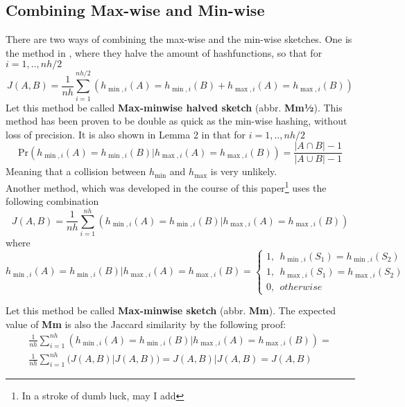 \documentclass[../../main.tex]{subfiles}
\begin{document}
\subsection{Combining Max-wise and Min-wise}

There are two ways of combining the max-wise and the min-wise sketches. One is the method in \cite{minmaxhash}, where they halve the amount of hashfunctions, so that for $i=1,..,nh/2$
\begin{equation}\label{minmaxhalfjaccard}
J(A,B)=\frac{1}{nh}\sum_{i=1}^{nh/2}(h_{\min,i}(A) = h_{\min,i}(B) + h_{\max,i}(A) = h_{\max,i}(B))
\end{equation}
Let this method be called \textbf{Max-minwise halved sketch} (abbr. {\bf Mm½}). This method has been proven to be double as quick as the min-wise hashing, without loss of precision\cite{minmaxhash}. It is also shown in Lemma 2 in \cite{minmaxhash} that for $i=1,..,nh/2$
$$
\mathrm{Pr}(h_{\min,i}(A) = h_{\min,i}(B) | h_{\max,i}(A) = h_{\max,i}(B)) = \frac{|A\cap B|-1}{|A\cup B| -1}
$$
Meaning that a collision between $h_{\min}$ and $h_{\max}$ is very unlikely.\\

Another method, which was developed in the course of this paper\footnote{In a stroke of dumb luck, may I add} uses the following combination
\begin{equation}\label{minmaxjaccard}
J(A,B)=\frac{1}{nh}\sum_{i=1}^{nh}(h_{\min,i}(A) = h_{\min,i}(B) | h_{\max,i}(A) = h_{\max,i}(B))
\end{equation}
where
$$
h_{\min,i}(A) = h_{\min,i}(B) | h_{\max,i}(A) = h_{\max,i}(B) = \left\{ \begin{array}{ll}
												1, \ \ h_{\min,i}(S_1)=h_{\min,i}(S_2)\\
												1, \ \ h_{\max,i}(S_1)=h_{\max,i}(S_2)\\
												0, \ \ otherwise
											  \end{array}\right.
$$

Let this method be called \textbf{Max-minwise sketch} (abbr. {\bf Mm}). The expected value of {\bf Mm} is also the Jaccard similarity by the following proof:\\
\begin{equation}\label{proofofMinmax}
\begin{split}
\frac{1}{nh}\sum_{i=1}^{nh}(h_{\min,i}(A) = h_{\min,i}(B) | h_{\max,i}(A) = h_{\max,i}(B)) =\\\frac{1}{nh}\sum_{i=1}^{nh}(J(A,B) | J(A,B)) = J(A,B)|J(A,B) = J(A,B)
\end{split}
\end{equation}
\end{document}
